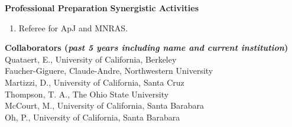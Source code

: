 \documentclass[11pt,letterpaper,english]{article}
\begin{document}
\begin{flushleft} {\bf Professional Preparation}
\vspace{.04in}
{\bf Synergistic Activities}
\vspace{-6pt}
\begin{enumerate} \itemsep1pt \parskip0pt 
\item Referee for ApJ and MNRAS. \\
\end{enumerate} 

\vspace{-6pt}
{\bf Collaborators ({\emph{past 5 years including name and current institution}})} \\
{\parindent 16pt
Quataert, E., University of California, Berkeley \\
Faucher-Giguere, Claude-Andre, Northwestern University \\
Martizzi, D., University of California, Santa Cruz \\
Thompson, T. A., The Ohio State University \\
McCourt, M., University of California, Santa Barabara \\
Oh, P., University of California, Santa Barabara \\
}


\end{flushleft}
\end{document}
